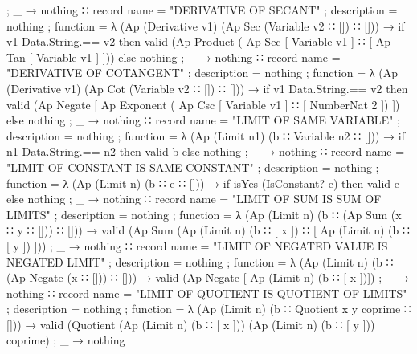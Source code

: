 \documentclass{report}
\begin{document}
\begin{code}
{{              ; _ → nothing}
          }
      ∷ record
          { name = "DERIVATIVE OF SECANT"
          ; description = nothing
          ; function =
            λ { (Ap (Derivative v1) (Ap Sec (Variable v2 ∷ []) ∷ [])) →
                if v1 Data.String.== v2
                  then valid (Ap Product
                                 ( Ap Sec [ Variable v1 ]
                                 ∷ [ Ap Tan [ Variable v1 ] ]))
                  else nothing
              ; _ → nothing}
          }
      ∷ record
          { name = "DERIVATIVE OF COTANGENT"
          ; description = nothing
          ; function =
            λ { (Ap (Derivative v1) (Ap Cot (Variable v2 ∷ []) ∷ [])) →
                if v1 Data.String.== v2
                  then valid (Ap Negate
                                 [ Ap Exponent
                                      ( Ap Csc [ Variable v1 ]
                                      ∷ [ NumberNat 2 ]) ])
                  else nothing
              ; _ → nothing}
          }
      ∷ record
          { name = "LIMIT OF SAME VARIABLE"
          ; description = nothing
          ; function =
            λ { (Ap (Limit n1) (b ∷ Variable n2 ∷ [])) →
                if n1 Data.String.== n2
                   then valid b
                   else nothing
              ; _ → nothing}
          }
      ∷ record
          { name = "LIMIT OF CONSTANT IS SAME CONSTANT"
          ; description = nothing
          ; function =
            λ { (Ap (Limit n) (b ∷ e ∷ [])) →
                if isYes (IsConstant? e) then valid e else nothing
              ; _ → nothing}
          }
      ∷ record
          { name = "LIMIT OF SUM IS SUM OF LIMITS"
          ; description = nothing
          ; function =
            λ { (Ap (Limit n) (b ∷ (Ap Sum (x ∷ y ∷ [])) ∷ [])) →
                valid (Ap Sum (Ap (Limit n) (b ∷ [ x ]) ∷ [ Ap (Limit n) (b ∷ [ y ]) ]))
              ; _ → nothing}
          }
      ∷ record
          { name = "LIMIT OF NEGATED VALUE IS NEGATED LIMIT"
          ; description = nothing
          ; function =
            λ { (Ap (Limit n) (b ∷ (Ap Negate (x ∷ [])) ∷ [])) →
                valid (Ap Negate [ Ap (Limit n) (b ∷ [ x ])])
              ; _ → nothing}
          }
      ∷ record
          { name = "LIMIT OF QUOTIENT IS QUOTIENT OF LIMITS"
          ; description = nothing
          ; function =
            λ { (Ap (Limit n) (b ∷ Quotient x y coprime ∷ [])) →
                valid (Quotient (Ap (Limit n) (b ∷ [ x ]))
                                (Ap (Limit n) (b ∷ [ y ]))
                                coprime)
              ; _ → nothing}
}
\end{code}
\end{document}
